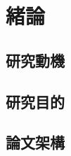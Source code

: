 \documentclass[class=NCU_thesis, crop=false]{standalone}
\begin{document}
\chapter{緒論}
\section{研究動機}



\section{研究目的}



\section{論文架構}
\end{document}
